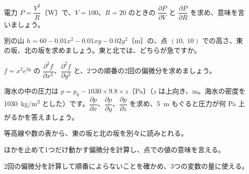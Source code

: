 \bkproblem 電力 $P=\dfrac{V^2}{R}$〔W〕で、$V=100$、$R=20$ のときの $\dfrac{\partial P}{\partial V}$ と $\dfrac{\partial P}{\partial R}$ を求め、意味を言いましょう。


\bkproblem 別の山 $h=60-0.01x^2-0.01xy-0.02y^2$〔m〕の、点 $(10,\ 10)$ での高さ、東の坂、北の坂を求めましょう。東と北では、どちらが急ですか。

\bkproblem $f=x^2e^{3y}$ の $\dfrac{\partial^2f}{\partial x^2}$、$\dfrac{\partial^2f}{\partial y^2}$ と、2つの順番の2回の偏微分を求めましょう。

\bkproblem 海水の中の圧力は $p=p_0-1030\times9.8\times z$〔Pa〕（$z$ は上向き、m。海水の密度を \qty{1030}{kg/m^3} とした）です。$\dfrac{\partial p}{\partial x}$、$\dfrac{\partial p}{\partial y}$、$\dfrac{\partial p}{\partial z}$ を求め、\qty{5}{m} もぐると圧力が何 Pa 上がるかを答えましょう。

\begin{furikaeri}
\begin{checklist}
\item 等高線や数の表から、東の坂と北の坂を別々に読みとれる。
\item ほかを止めて1つだけ動かす偏微分を計算し、点での値の意味を言える。
\item 2回の偏微分を計算して順番によらないことを確かめ、3つの変数の量に使える。
\end{checklist}
\end{furikaeri}

